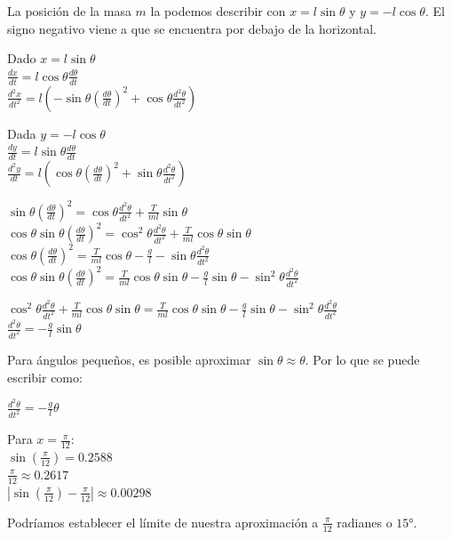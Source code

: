 \documentclass[10pt, a4paper]{article}
\begin{document}
\begin{enumerate}
\begin{enumerate}
\begin{center}
                La posición de la masa $m$ la podemos describir con $x=l\sin\theta$ y $y=-l\cos\theta$. 
                El signo negativo viene a que se encuentra por debajo de la horizontal. 

                Dado $x=l\sin\theta$\\
                $\frac{dx}{dt}=l\cos\theta\frac{d\theta}{dt}$\\
                $\frac{d^2x}{dt^2}=l(-\sin\theta(\frac{d\theta}{dt})^2+\cos\theta\frac{d^2\theta}{dt^2})$


                Dada $y=-l\cos\theta$\\
                $\frac{dy}{dt}=l\sin\theta\frac{d\theta}{dt}$\\
                $\frac{d^2y}{dt}=l(\cos\theta(\frac{d\theta}{dt})^2+\sin\theta\frac{d^2\theta}{dt^2})$

                $\sin\theta(\frac{d\theta}{dt})^2= \cos\theta\frac{d^2\theta}{dt^2} + \frac{T}{ml}\sin\theta$\\
                $\cos\theta\sin\theta(\frac{d\theta}{dt})^2=\cos^2\theta\frac{d^2\theta}{dt^2}+\frac{T}{ml}\cos\theta\sin\theta$\\
                $\cos\theta(\frac{d\theta}{dt})^2=\frac{T}{ml}\cos\theta-\frac{\si{g}}{l}-\sin\theta\frac{d^2\theta}{dt^2}$\\
                $\cos\theta\sin\theta(\frac{d\theta}{dt})^2=\frac{T}{ml}\cos\theta\sin\theta-\frac{\si{g}}{l}\sin\theta-\sin^2\theta\frac{d^2\theta}{dt^2}$

                $\cos^2\theta\frac{d^2\theta}{dt^2}+\frac{T}{ml}\cos\theta\sin\theta=\frac{T}{ml}\cos\theta\sin\theta-\frac{\si{g}}{l}\sin\theta-\sin^2\theta\frac{d^2\theta}{dt^2}$\\
                $\frac{d^2\theta}{dt^2}=-\frac{\si{g}}{l}\sin\theta$

                Para ángulos pequeños, es posible aproximar $\sin\theta\approx\theta$. Por lo que se puede
                escribir como:

                $\frac{d^2\theta}{dt^2}=-\frac{\si{g}}{l}\theta$

                Para $x=\frac{\pi}{12}$:\\
                $\sin(\frac{\pi}{12})=0.2588$\\
                $\frac{\pi}{12}\approx 0.2617$\\
                $|\sin(\frac{\pi}{12})-\frac{\pi}{12}|\approx 0.00298$

                Podríamos establecer el límite de nuestra aproximación a $\frac{\pi}{12}$ radianes o $\ang{15}$.



\end{center}
\end{enumerate}
\end{enumerate}
\end{document}
